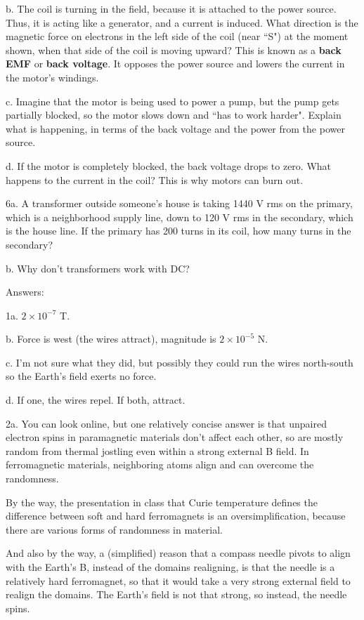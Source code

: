 \documentclass[12pt]{article}
\begin{document}
b. The coil is turning in the field, because it is attached to the power source. Thus, it is acting like a generator, and a current is induced. What direction is the magnetic force on electrons in the left side of the coil (near ``S") at the moment shown, when that side of the coil is moving upward? This is known as a \textbf{back EMF} or \textbf{back voltage}. It opposes the power source and lowers the current in the motor's windings.

c. Imagine that the motor is being used to power a pump, but the pump gets partially blocked, so the motor slows down and ``has to work harder". Explain what is happening, in terms of the back voltage and the power from the power source. 

d. If the motor is completely blocked, the back voltage drops to zero. What happens to the current in the coil? This is why motors can burn out.

\bigskip
\bigskip

6a. A transformer outside someone's house is taking 1440 V rms on the primary, which is a neighborhood supply line, down to 120 V rms in the secondary, which is the house line. If the primary has 200 turns in its coil, how many turns in the secondary?

b. Why don't transformers work with DC?

\newpage

Answers:

1a. $2\times 10^{-7}$ T. 

b. Force is west (the wires attract), magnitude is $2\times 10^{-5}$ N. 

c. I'm not sure what they did, but possibly they could run the wires north-south so the Earth's field exerts no force.

d. If one, the wires repel. If both, attract.

2a. You can look online, but one relatively concise answer is that unpaired electron spins in paramagnetic materials don't affect each other, so are mostly random from thermal jostling even within a strong external B field. In ferromagnetic materials, neighboring atoms align and can overcome the randomness. 

By the way, the presentation in class that Curie temperature defines the difference between soft and hard ferromagnets is an oversimplification, because there are various forms of randomness in material. 

And also by the way, a (simplified) reason that a compass needle pivots to align with the Earth's B, instead of the domains realigning, is that the needle is a relatively hard ferromagnet, so that it would take a very strong external field to realign the domains. The Earth's field is not that strong, so instead, the needle spins.
\end{document}
